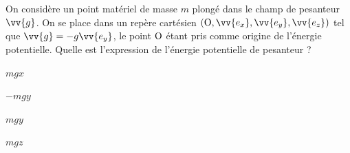 


\hauteurLargeurCadreReponse		{8mm}{3cm}
\initialisationEntrainement


\debutEntrainement


\begin{enonce}
	On considère un point matériel de masse $m$ plongé dans le champ de pesanteur $\vv{g}$. On se place dans un repère cartésien $(\ptO,\vv{e_x},\vv{e_y},\vv{e_z})$ tel que $\vv{g}=-g\vv{e_y}$, le point $\ptO$ étant pris comme origine de l'énergie potentielle. Quelle est l'expression de l'énergie potentielle de pesanteur ?
	
	\begin{listeQCM5Colonnes}
	\item $mgx$
	\item $-mgy$
	\item $mgy$
	\item $mgz$
	\end{listeQCM5Colonnes}
\end{enonce}

\reponse{\reponseC{}}


